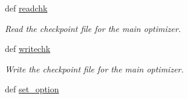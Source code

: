 \begin{DoxyCompactItemize}
def \hyperlink{classforcebalance_1_1optimizer_1_1Optimizer_a05ee5fe985b3e2ec71071ca061e42d66}{readchk}
\begin{DoxyCompactList}\small\item\em \-Read the checkpoint file for the main optimizer. \end{DoxyCompactList}\item 
def \hyperlink{classforcebalance_1_1optimizer_1_1Optimizer_aa7ac7cda43b70ac58ccbd6c8445e88ef}{writechk}
\begin{DoxyCompactList}\small\item\em \-Write the checkpoint file for the main optimizer. \end{DoxyCompactList}\item 
def \hyperlink{classforcebalance_1_1BaseClass_a73e9a37a7632e79eb99f49bd15aced45}{set\-\_\-option}
\end{DoxyCompactItemize}
